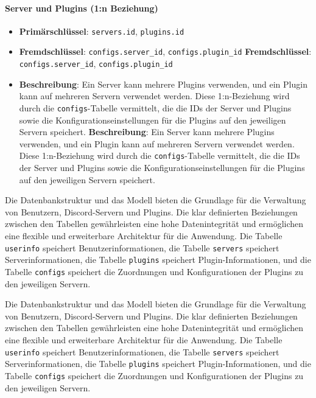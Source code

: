 \paragraph{Server und Plugins (1:n Beziehung)}\label{server-und-plugins-1n-beziehung}

\begin{itemize}
\item
  \textbf{Primärschlüssel}: \texttt{servers.id}, \texttt{plugins.id}
\item
  \textbf{Fremdschlüssel}: \texttt{configs.server\_id}, \texttt{configs.plugin\_id}
  \textbf{Fremdschlüssel}: \texttt{configs.server\_id}, \texttt{configs.plugin\_id}
\item
  \textbf{Beschreibung}: Ein Server kann mehrere Plugins verwenden, und ein Plugin kann auf mehreren Servern verwendet werden. Diese 1:n-Beziehung wird durch die \texttt{configs}-Tabelle vermittelt, die die IDs der Server und Plugins sowie die Konfigurationseinstellungen für die Plugins auf den jeweiligen Servern speichert.
  \textbf{Beschreibung}: Ein Server kann mehrere Plugins verwenden, und ein Plugin kann auf mehreren Servern verwendet werden. Diese 1:n-Beziehung wird durch die \texttt{configs}-Tabelle vermittelt, die die IDs der Server und Plugins sowie die Konfigurationseinstellungen für die Plugins auf den jeweiligen Servern speichert.
\end{itemize}

Die Datenbankstruktur und das Modell bieten die Grundlage für die Verwaltung von Benutzern, Discord-Servern und Plugins. Die klar definierten Beziehungen zwischen den Tabellen gewährleisten eine hohe Datenintegrität und ermöglichen eine flexible und erweiterbare Architektur für die Anwendung. Die Tabelle \texttt{userinfo} speichert Benutzerinformationen, die Tabelle \texttt{servers} speichert Serverinformationen, die Tabelle \texttt{plugins} speichert Plugin-Informationen, und die Tabelle \texttt{configs} speichert die Zuordnungen und Konfigurationen der Plugins zu den jeweiligen Servern.

Die Datenbankstruktur und das Modell bieten die Grundlage für die Verwaltung von Benutzern, Discord-Servern und Plugins. Die klar definierten Beziehungen zwischen den Tabellen gewährleisten eine hohe Datenintegrität und ermöglichen eine flexible und erweiterbare Architektur für die Anwendung. Die Tabelle \texttt{userinfo} speichert Benutzerinformationen, die Tabelle \texttt{servers} speichert Serverinformationen, die Tabelle \texttt{plugins} speichert Plugin-Informationen, und die Tabelle \texttt{configs} speichert die Zuordnungen und Konfigurationen der Plugins zu den jeweiligen Servern.



